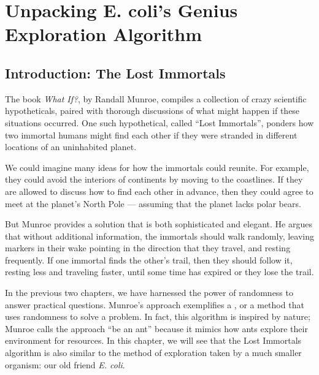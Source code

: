 \chapter[Unpacking E. coli’s Genius Exploration Algorithm]{Unpacking E. coli’s Genius Exploration Algorithm}
\label{chapter:chemotaxis}
\renewcommand{\chaptertitle}{Unpacking E. coli’s Genius Exploration Algorithm}

\FloatBarrier

\section{Introduction: The Lost Immortals}
\label{sec:introduction}

The book \textit{What If?}, by Randall Munroe, compiles a collection of crazy scientific hypotheticals, paired with thorough discussions of what might happen if these situations occurred. One such hypothetical, called ``Lost Immortals'', ponders how two immortal humans might find each other if they were stranded in different locations of an uninhabited planet.

We could imagine many ideas for how the immortals could reunite. For example, they could avoid the interiors of continents by moving to the coastlines. If they are allowed to discuss how to find each other in advance, then they could agree to meet at the planet's North Pole --- assuming that the planet lacks polar bears.

But Munroe provides a solution that is both sophisticated and elegant. He argues that without additional information, the immortals should walk randomly, leaving markers in their wake pointing in the direction that they travel, and resting frequently. If one immortal finds the other's trail, then they should follow it, resting less and traveling faster, until some time has expired or they lose the trail.

In the previous two chapters, we have harnessed the power of randomness to answer practical questions. Munroe's approach exemplifies a , or a method that uses randomness to solve a problem. In fact, this algorithm is inspired by nature; Munroe calls the approach ``be an ant'' because it mimics how ants explore their environment for resources. In this chapter, we will see that the Lost Immortals algorithm is also similar to the method of exploration taken by a much smaller organism: our old friend \textit{E. coli}.

